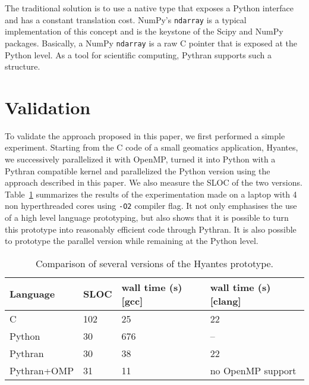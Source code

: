 \documentclass{llncs}
\begin{document}
The traditional solution is to use a native type that exposes a Python interface
and has a constant translation cost. NumPy's \texttt{ndarray} is a typical
implementation of this concept and is the keystone of the Scipy and NumPy
packages. Basically, a NumPy \texttt{ndarray} is a raw C pointer that is exposed
at the Python level. As a tool for scientific computing, Pythran supports such a
structure.

\section{Validation}\label{sec:validation}

To validate the approach proposed in this paper, we first performed a simple
experiment. Starting from the C code of a small geomatics application, Hyantes,
we successively parallelized it with OpenMP, turned it into Python with a
Pythran compatible kernel and parallelized the Python version using the approach
described in this paper. We also measure the SLOC of the two versions.
Table~\ref{tbl:hyantes} summarizes the results of the experimentation made on a
laptop with 4 non hyperthreaded cores using \texttt{-O2} compiler flag. It not
only emphasises the use of a high level language prototyping, but also shows
that it is possible to turn this prototype into reasonably efficient code
through Pythran. It is also possible to prototype the parallel version while
remaining at the Python level.

\begin{table}

    \caption{Comparison of several versions of the Hyantes prototype.}
    \label{tbl:hyantes}

    \centering
    \begin{tabular}{|l|l|l|l|}
        \hline
        Language & SLOC & wall time (s) [gcc] & wall time (s) [clang]\\
        \hline
        C       & 102   & 25 & 22 \\
        Python  & 30    & 676 & --\\
        Pythran & 30    & 38 &  22 \\
        Pythran+OMP    & 31    & 11 & no OpenMP support\\
        \hline
    \end{tabular}

\end{table}
\end{document}
